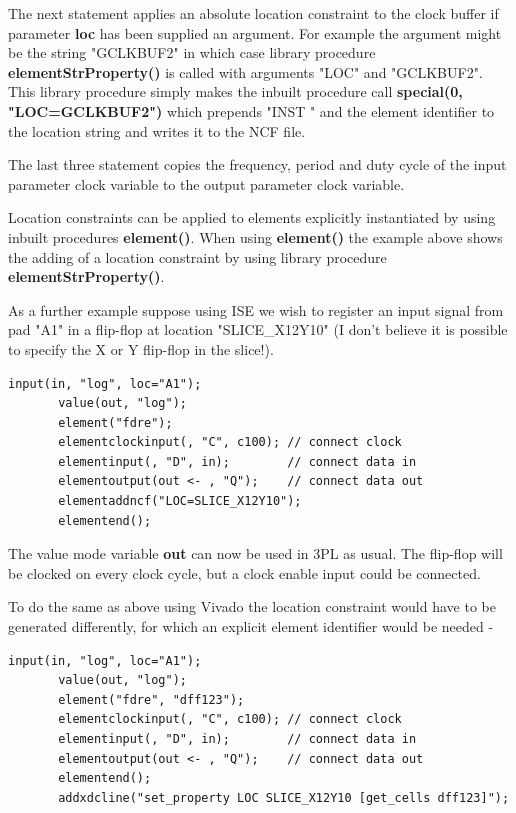     The next statement applies an absolute location constraint to the clock buffer
    if parameter {\bf loc} has been supplied an argument. For example the argument
    might be the string "GCLKBUF2" in which case library procedure
    {\bf elementStrProperty()} is called with arguments "LOC" and "GCLKBUF2". This
    library procedure simply makes the inbuilt procedure call
    {\bf special(0, "LOC=GCLKBUF2")} which prepends "INST " and the element
    identifier to the location string and writes it to the NCF file.
    
    The last three statement copies the frequency, period and duty cycle of the
    input parameter clock variable to the output parameter clock variable.
        
    Location constraints can be applied to elements explicitly instantiated by
    using inbuilt procedures {\bf element()}. When using {\bf element()} the
    example above shows the adding of a location constraint by using library
    procedure {\bf elementStrProperty()}.
    
    As a further example suppose using ISE we wish to register an input signal from pad
    "A1" in a flip-flop at location "SLICE\_X12Y10" (I don't believe it is possible to
    specify the X or Y flip-flop in the slice!).
    \begin{lstlisting}[gobble=4, language=threepl]
       input(in, "log", loc="A1");
       value(out, "log");
       element("fdre");
       elementclockinput(, "C", c100); // connect clock
       elementinput(, "D", in);        // connect data in
       elementoutput(out <- , "Q");    // connect data out
       elementaddncf("LOC=SLICE_X12Y10");
       elementend();
    \end{lstlisting}
    The value mode variable {\bf out} can now be used in 3PL as usual. The flip-flop
    will be clocked on every clock cycle, but a clock enable input could
    be connected.
    
    To do the same as above using Vivado the location constraint would have to be
    generated differently, for which an explicit element identifier would be needed -
    \begin{lstlisting}[gobble=4, language=threepl]
       input(in, "log", loc="A1");
       value(out, "log");
       element("fdre", "dff123");
       elementclockinput(, "C", c100); // connect clock
       elementinput(, "D", in);        // connect data in
       elementoutput(out <- , "Q");    // connect data out
       elementend();
       addxdcline("set_property LOC SLICE_X12Y10 [get_cells dff123]");   
    \end{lstlisting}    
    
